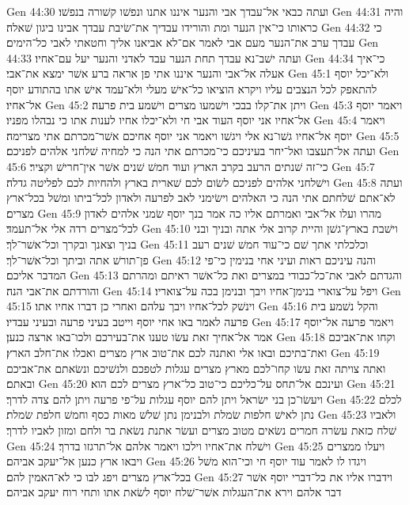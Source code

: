 Gen 44:30  ועתה כבאי אל־עבדך אבי והנער איננו אתנו ונפשׁו קשׁורה בנפשׁו׃
Gen 44:31  והיה כראותו כי־אין הנער ומת והורידו עבדיך את־שׂיבת עבדך אבינו ביגון שׁאלה׃
Gen 44:32  כי עבדך ערב את־הנער מעם אבי לאמר אם־לא אביאנו אליך וחטאתי לאבי כל־הימים׃
Gen 44:33  ועתה ישׁב־נא עבדך תחת הנער עבד לאדני והנער יעל עם־אחיו׃
Gen 44:34  כי־איך אעלה אל־אבי והנער איננו אתי פן אראה ברע אשׁר ימצא את־אבי׃
Gen 45:1  ולא־יכל יוסף להתאפק לכל הנצבים עליו ויקרא הוציאו כל־אישׁ מעלי ולא־עמד אישׁ אתו בהתודע יוסף אל־אחיו׃
Gen 45:2  ויתן את־קלו בבכי וישׁמעו מצרים וישׁמע בית פרעה׃
Gen 45:3  ויאמר יוסף אל־אחיו אני יוסף העוד אבי חי ולא־יכלו אחיו לענות אתו כי נבהלו מפניו׃
Gen 45:4  ויאמר יוסף אל־אחיו גשׁו־נא אלי ויגשׁו ויאמר אני יוסף אחיכם אשׁר־מכרתם אתי מצרימה׃
Gen 45:5  ועתה אל־תעצבו ואל־יחר בעיניכם כי־מכרתם אתי הנה כי למחיה שׁלחני אלהים לפניכם׃
Gen 45:6  כי־זה שׁנתים הרעב בקרב הארץ ועוד חמשׁ שׁנים אשׁר אין־חרישׁ וקציר׃
Gen 45:7  וישׁלחני אלהים לפניכם לשׂום לכם שׁארית בארץ ולהחיות לכם לפליטה גדלה׃
Gen 45:8  ועתה לא־אתם שׁלחתם אתי הנה כי האלהים וישׂימני לאב לפרעה ולאדון לכל־ביתו ומשׁל בכל־ארץ מצרים׃
Gen 45:9  מהרו ועלו אל־אבי ואמרתם אליו כה אמר בנך יוסף שׂמני אלהים לאדון לכל־מצרים רדה אלי אל־תעמד׃
Gen 45:10  וישׁבת בארץ־גשׁן והיית קרוב אלי אתה ובניך ובני בניך וצאנך ובקרך וכל־אשׁר־לך׃
Gen 45:11  וכלכלתי אתך שׁם כי־עוד חמשׁ שׁנים רעב פן־תורשׁ אתה וביתך וכל־אשׁר־לך׃
Gen 45:12  והנה עיניכם ראות ועיני אחי בנימין כי־פי המדבר אליכם׃
Gen 45:13  והגדתם לאבי את־כל־כבודי במצרים ואת כל־אשׁר ראיתם ומהרתם והורדתם את־אבי הנה׃
Gen 45:14  ויפל על־צוארי בנימן־אחיו ויבך ובנימן בכה על־צואריו׃
Gen 45:15  וינשׁק לכל־אחיו ויבך עלהם ואחרי כן דברו אחיו אתו׃
Gen 45:16  והקל נשׁמע בית פרעה לאמר באו אחי יוסף וייטב בעיני פרעה ובעיני עבדיו׃
Gen 45:17  ויאמר פרעה אל־יוסף אמר אל־אחיך זאת עשׂו טענו את־בעירכם ולכו־באו ארצה כנען׃
Gen 45:18  וקחו את־אביכם ואת־בתיכם ובאו אלי ואתנה לכם את־טוב ארץ מצרים ואכלו את־חלב הארץ׃
Gen 45:19  ואתה צויתה זאת עשׂו קחו־לכם מארץ מצרים עגלות לטפכם ולנשׁיכם ונשׂאתם את־אביכם ובאתם׃
Gen 45:20  ועינכם אל־תחס על־כליכם כי־טוב כל־ארץ מצרים לכם הוא׃
Gen 45:21  ויעשׂו־כן בני ישׂראל ויתן להם יוסף עגלות על־פי פרעה ויתן להם צדה לדרך׃
Gen 45:22  לכלם נתן לאישׁ חלפות שׂמלת ולבנימן נתן שׁלשׁ מאות כסף וחמשׁ חלפת שׂמלת׃
Gen 45:23  ולאביו שׁלח כזאת עשׂרה חמרים נשׂאים מטוב מצרים ועשׂר אתנת נשׂאת בר ולחם ומזון לאביו לדרך׃
Gen 45:24  וישׁלח את־אחיו וילכו ויאמר אלהם אל־תרגזו בדרך׃
Gen 45:25  ויעלו ממצרים ויבאו ארץ כנען אל־יעקב אביהם׃
Gen 45:26  ויגדו לו לאמר עוד יוסף חי וכי־הוא משׁל בכל־ארץ מצרים ויפג לבו כי לא־האמין להם׃
Gen 45:27  וידברו אליו את כל־דברי יוסף אשׁר דבר אלהם וירא את־העגלות אשׁר־שׁלח יוסף לשׂאת אתו ותחי רוח יעקב אביהם׃
